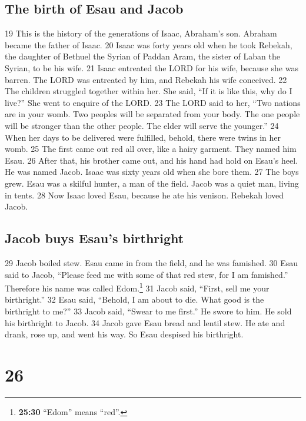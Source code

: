 \hypertarget{the-birth-of-esau-and-jacob}{%
\subsection{The birth of Esau and
Jacob}\label{the-birth-of-esau-and-jacob}}

{19} This is the history of the generations of Isaac, Abraham's son.
Abraham became the father of Isaac. {20} Isaac was forty years old when
he took Rebekah, the daughter of Bethuel the Syrian of Paddan Aram, the
sister of Laban the Syrian, to be his wife. {21} Isaac entreated the
LORD for his wife, because she was barren. The LORD was entreated by
him, and Rebekah his wife conceived. {22} The children struggled
together within her. She said, ``If it is like this, why do I live?''
She went to enquire of the LORD. {23} The LORD said to her, ``Two
nations are in your womb. Two peoples will be separated from your body.
The one people will be stronger than the other people. The elder will
serve the younger.'' {24} When her days to be delivered were fulfilled,
behold, there were twins in her womb. {25} The first came out red all
over, like a hairy garment. They named him Esau. {26} After that, his
brother came out, and his hand had hold on Esau's heel. He was named
Jacob. Isaac was sixty years old when she bore them. {27} The boys grew.
Esau was a skilful hunter, a man of the field. Jacob was a quiet man,
living in tents. {28} Now Isaac loved Esau, because he ate his venison.
Rebekah loved Jacob.

\hypertarget{jacob-buys-esaus-birthright}{%
\subsection{Jacob buys Esau's
birthright}\label{jacob-buys-esaus-birthright}}

{29} Jacob boiled stew. Esau came in from the field, and he was
famished. {30} Esau said to Jacob, ``Please feed me with some of that
red stew, for I am famished.'' Therefore his name was called
Edom.\footnote{\textbf{25:30} ``Edom'' means ``red''.} {31} Jacob said,
``First, sell me your birthright.'' {32} Esau said, ``Behold, I am about
to die. What good is the birthright to me?'' {33} Jacob said, ``Swear to
me first.'' He swore to him. He sold his birthright to Jacob. {34} Jacob
gave Esau bread and lentil stew. He ate and drank, rose up, and went his
way. So Esau despised his birthright.

\hypertarget{section-25}{%
\section{26}\label{section-25}}

